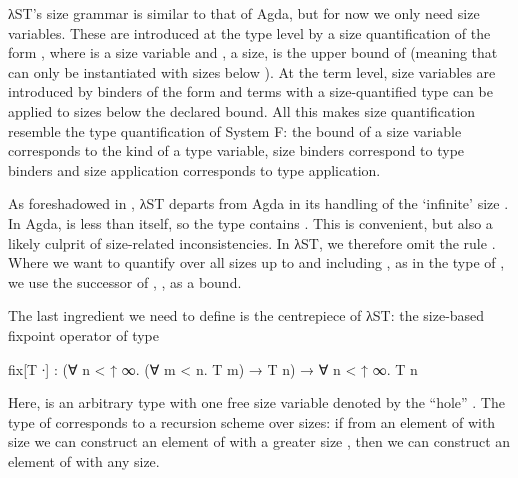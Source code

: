 λST's size grammar is similar to that of Agda, but for now we only need size
variables. These are introduced at the type level by a size quantification of
the form , where  is a size variable and , a
size, is the upper bound of  (meaning that  can only be
instantiated with sizes below ). At the term level, size variables are
introduced by binders of the form  and terms with a
size-quantified type can be applied to sizes below the declared bound. All this
makes size quantification resemble the type quantification of System F: the
bound of a size variable corresponds to the kind of a type variable, size
binders correspond to type binders and size application corresponds to type
application.

As foreshadowed in , λST departs from Agda in its
handling of the \enquote*{infinite} size . In Agda,  is less
than itself, so the type  contains . This is convenient,
but also a likely culprit of size-related inconsistencies. In λST, we therefore
omit the rule . Where we want to quantify over all sizes up to and
including , as in the type of , we use the successor of
, , as a bound.

The last ingredient we need to define  is the centrepiece of λST:
the size-based fixpoint operator  of type
\begin{code}
  fix[T ∙] : (∀ n < ↑ ∞. (∀ m < n. T m) → T n) → ∀ n < ↑ ∞. T n
\end{code}
Here,  is an arbitrary type with one free size variable denoted by the
\enquote{hole} . The type of  corresponds to a recursion
scheme over sizes: if from an element of  with size  we can
construct an element of  with a greater size , then we can
construct an element of  with any size.

